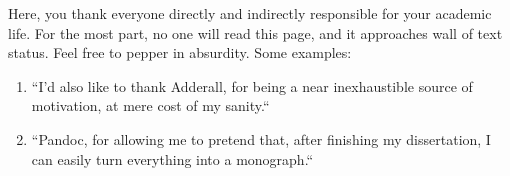 Here, you thank everyone directly and indirectly responsible for your academic life. For the most part, no one will read this page, and it approaches wall of text status. Feel free to pepper in absurdity. Some examples:

\begin{enumerate}
\item ``I'd also like to thank Adderall, for being a near inexhaustible source of motivation, at mere cost of my sanity.``
\item ``Pandoc, for allowing me to pretend that, after finishing my dissertation, I can easily turn everything into a monograph.``
\end{enumerate}